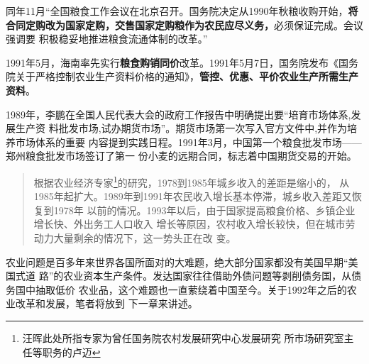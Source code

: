 同年11月“全国粮食工作会议在北京召开。国务院决定从1990年秋粮收购开始，\textbf{将
  合同定购改为国家定购，交售国家定购粮作为农民应尽义务，}必须保证完成。会议强调要
积极稳妥地推进粮食流通体制的改革。”

1991年5月，海南率先实行\textbf{粮食购销同价}改革。1991年5月7日，国务院发布《国务
院关于严格控制农业生产资料价格的通知》，\textbf{管控、优惠、平价农业生产所需生产
  资料}。

1989年，李鹏在全国人民代表大会的政府工作报告中明确提出要“培育市场体系,发展生产资
料批发市场,试办期货市场”。期货市场第一次写入官方文件中,并作为培养市场体系的重要
内容提到实践日程。1991年3月，中国第一个粮食批发市场——郑州粮食批发市场签订了第一
份小麦的远期合同，标志着中国期货交易的开始。\cite{taochangsheng}



\begin{quotation}
  根据农业经济专家\footnote{汪晖此处所指专家为曾任国务院农村发展研究中心发展研究
    所市场研究室主任等职务的卢迈}的研究，1978到1985年城乡收入的差距是缩小的，
  从1985年起扩大。1989年到1991年农民收入增长基本停滞，城乡收入差距又恢复到1978年
  以前的情况。1993年以后，由于国家提高粮食价格、乡镇企业增长快、外出务工人口收入
  增长等原因，农村收入增长较快，但在城市劳动力大量剩余的情况下，这一势头正在改
  变。\cite{wangxiandai}

\end{quotation}

农业问题是百多年来世界各国所面对的大难题，绝大部分国家都没有美国早期“美国式道
路”的农业资本生产条件。发达国家往往借助外债问题等剥削债务国，从债务国中抽取低价
农业品，这个难题也一直萦绕着中国至今。关于1992年之后的农业改革和发展，笔者将放到
下一章来讲述。




